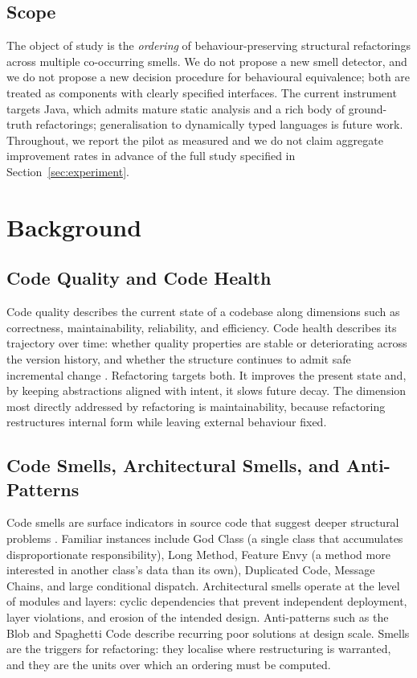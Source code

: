 \documentclass[journal,onecolumn,11pt]{IEEEtran}
\begin{document}
\subsection{Scope}
The object of study is the \emph{ordering} of behaviour-preserving structural refactorings across multiple co-occurring smells. We do not propose a new smell detector, and we do not propose a new decision procedure for behavioural equivalence; both are treated as components with clearly specified interfaces. The current instrument targets Java, which admits mature static analysis and a rich body of ground-truth refactorings; generalisation to dynamically typed languages is future work. Throughout, we report the pilot as measured and we do not claim aggregate improvement rates in advance of the full study specified in Section~\ref{sec:experiment}.

\section{Background}
\subsection{Code Quality and Code Health}
Code quality describes the current state of a codebase along dimensions such as correctness, maintainability, reliability, and efficiency. Code health describes its trajectory over time: whether quality properties are stable or deteriorating across the version history, and whether the structure continues to admit safe incremental change \cite{tornhill2022}. Refactoring targets both. It improves the present state and, by keeping abstractions aligned with intent, it slows future decay. The dimension most directly addressed by refactoring is maintainability, because refactoring restructures internal form while leaving external behaviour fixed.

\subsection{Code Smells, Architectural Smells, and Anti-Patterns}
Code smells are surface indicators in source code that suggest deeper structural problems \cite{fowler2018}. Familiar instances include God Class (a single class that accumulates disproportionate responsibility), Long Method, Feature Envy (a method more interested in another class's data than its own), Duplicated Code, Message Chains, and large conditional dispatch. Architectural smells operate at the level of modules and layers: cyclic dependencies that prevent independent deployment, layer violations, and erosion of the intended design. Anti-patterns such as the Blob and Spaghetti Code describe recurring poor solutions at design scale. Smells are the triggers for refactoring: they localise where restructuring is warranted, and they are the units over which an ordering must be computed.
\end{document}

